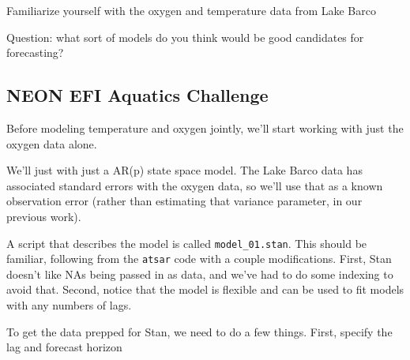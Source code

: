 \documentclass[
]{article}
\newenvironment{Shaded}{\begin{snugshade}}{\end{snugshade}}
\newcommand{\CommentTok}[1]{\textcolor[rgb]{0.56,0.35,0.01}{\textit{#1}}}
\newcommand{\DecValTok}[1]{\textcolor[rgb]{0.00,0.00,0.81}{#1}}
\newcommand{\KeywordTok}[1]{\textcolor[rgb]{0.13,0.29,0.53}{\textbf{#1}}}
\newcommand{\NormalTok}[1]{#1}
\newcommand{\OperatorTok}[1]{\textcolor[rgb]{0.81,0.36,0.00}{\textbf{#1}}}
\newcommand{\StringTok}[1]{\textcolor[rgb]{0.31,0.60,0.02}{#1}}
\begin{document}
\begin{Shaded}
\end{Shaded}

Familiarize yourself with the oxygen and temperature data from Lake
Barco

Question: what sort of models do you think would be good candidates for
forecasting?

\hypertarget{sec-neon-oxygen}{%
\subsection{NEON EFI Aquatics Challenge}\label{sec-neon-oxygen}}

Before modeling temperature and oxygen jointly, we'll start working with
just the oxygen data alone.

We'll just with just a AR(p) state space model. The Lake Barco data has
associated standard errors with the oxygen data, so we'll use that as a
known observation error (rather than estimating that variance parameter,
in our previous work).

A script that describes the model is called \texttt{model\_01.stan}.
This should be familiar, following from the \texttt{atsar} code with a
couple modifications. First, Stan doesn't like NAs being passed in as
data, and we've had to do some indexing to avoid that. Second, notice
that the model is flexible and can be used to fit models with any
numbers of lags.

To get the data prepped for Stan, we need to do a few things. First,
specify the lag and forecast horizon

\begin{Shaded}
\end{Shaded}
\end{document}
